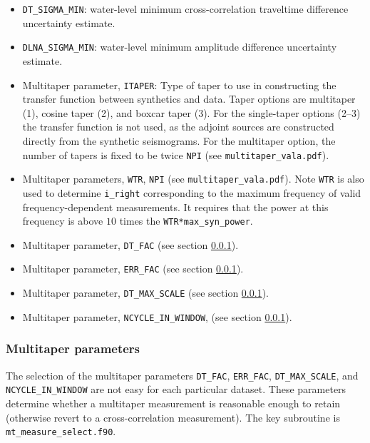 \documentclass[11pt,titlepage,fleqn]{article}
\newcommand{\refSec}[1]{section \ref{#1}}
\begin{document}
\begin{itemize}
\item \verb+DT_SIGMA_MIN+: water-level minimum cross-correlation traveltime difference uncertainty estimate.

\item \verb+DLNA_SIGMA_MIN+: water-level minimum amplitude difference uncertainty estimate.

\item Multitaper parameter, \verb+ITAPER+: Type of taper to use in constructing the transfer function between synthetics and data. Taper options are multitaper (1), cosine taper (2), and boxcar taper (3).  For the single-taper options (2--3) the transfer function is not used, as the adjoint sources are constructed directly from the synthetic seismograms. For the multitaper option, the number of tapers is fixed to be twice \verb+NPI+ (see \verb+multitaper_vala.pdf+).

\item Multitaper parameters, \verb+WTR+, \verb+NPI+ (see \verb+multitaper_vala.pdf+). Note \verb+WTR+ is also used to
determine \verb+i_right+ corresponding to the maximum frequency of valid frequency-dependent measurements. It requires 
that the power at this frequency is above $10$ times the \verb+WTR*max_syn_power+.

\item Multitaper parameter, \verb+DT_FAC+ (see \refSec{sec:MTparm}).

\item Multitaper parameter, \verb+ERR_FAC+ (see \refSec{sec:MTparm}).

\item Multitaper parameter, \verb+DT_MAX_SCALE+ (see \refSec{sec:MTparm}).

\item Multitaper parameter, \verb+NCYCLE_IN_WINDOW+, (see \refSec{sec:MTparm}).
\end{itemize}


\subsubsection{Multitaper parameters}
\label{sec:MTparm}

The selection of the multitaper parameters \verb+DT_FAC+, \verb+ERR_FAC+, \verb+DT_MAX_SCALE+, and \verb+NCYCLE_IN_WINDOW+ are not easy for each particular dataset.  These parameters determine whether a multitaper measurement is reasonable enough to retain (otherwise revert to a cross-correlation measurement). The key subroutine is \verb+mt_measure_select.f90+.
\end{document}
